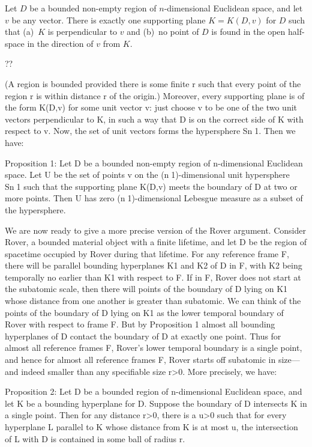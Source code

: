 \begin{lem}\label{lem:one-supp} Let $D$ be a bounded non-empty region of $n$-dimensional Euclidean space, and let $v$ be any vector. There is exactly one supporting plane $K=K(D,v)$ for $D$ such that (a)~$K$ is perpendicular to $v$ and (b)~no point of $D$ is found in the open half-space in the direction of $v$ from $K$.

??

(A region is bounded provided there is some finite r such that every point of the region r is within distance r of the origin.) Moreover, every supporting plane is of the form K(D,v) for some unit vector v: just choose v to be one of the two unit vectors perpendicular to K, in such a way that D is on the correct side of K with respect to v. Now, the set of unit vectors forms the hypersphere Sn1. Then we have:

Proposition 1: Let D be a bounded non-empty region of n-dimensional Euclidean space. Let U be the set of points v on the (n1)-dimensional unit hypersphere Sn1 such that the supporting plane K(D,v) meets the boundary of D at two or more points. Then U has zero (n1)-dimensional Lebesgue measure as a subset of the hypersphere.

	We are now ready to give a more precise version of the Rover argument. Consider Rover, a bounded material object with a finite lifetime, and let D be the region of spacetime occupied by Rover during that lifetime.  For any reference frame F, there will be parallel bounding hyperplanes K1 and K2 of D in F, with K2 being temporally no earlier than K1 with respect to F.  If in F, Rover does not start at the subatomic scale, then there will points of the boundary of D lying on K1 whose distance from one another is greater than subatomic. We can think of the points of the boundary of D lying on K1 as the lower temporal boundary of Rover with respect to frame F.
But by Proposition 1 almost all bounding hyperplanes of D contact the boundary of D at exactly one point. Thus for almost all reference frames F, Rover's lower temporal boundary is a single point, and hence for almost all reference frames F, Rover starts off subatomic in size—and indeed smaller than any specifiable size r>0. More precisely, we have:

Proposition 2: Let D be a bounded region of n-dimensional Euclidean space, and let K be a bounding hyperplane for D. Suppose the boundary of D intersects K in a single point. Then for any distance r>0, there is a u>0 such that for every hyperplane L parallel to K whose distance from K is at most u, the intersection of L with D is contained in some ball of radius r.


\end{lem}
